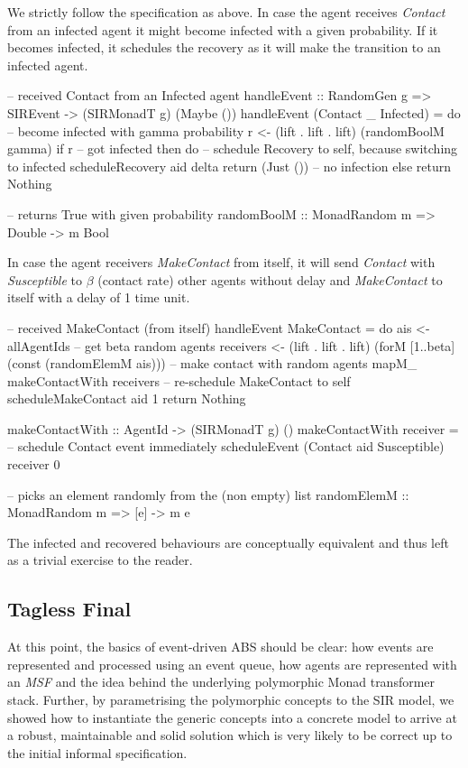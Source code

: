 We strictly follow the specification as above. In case the agent receives \textit{Contact} from an infected agent it might become infected with a given probability. If it becomes infected, it schedules the recovery as it will make the transition to an infected agent.

\begin{HaskellCode}
-- received Contact from an Infected agent
handleEvent :: RandomGen g => SIREvent -> (SIRMonadT g) (Maybe ())
handleEvent (Contact _ Infected) = do
  -- become infected with gamma probability
  r <- (lift . lift . lift) (randomBoolM gamma)
  if r
    -- got infected 
    then do
      -- schedule Recovery to self, because switching to infected
      scheduleRecovery aid delta
      return (Just ())
    -- no infection
    else return Nothing

-- returns True with given probability
randomBoolM :: MonadRandom m => Double -> m Bool
\end{HaskellCode}

In case the agent receivers \textit{MakeContact} from itself, it will send \textit{Contact} with \textit{Susceptible} to $\beta$ (contact rate) other agents without delay and \textit{MakeContact} to itself with a delay of 1 time unit.

\begin{HaskellCode}
-- received MakeContact (from itself)
handleEvent MakeContact = do
  ais <- allAgentIds
  -- get beta random agents
  receivers <- (lift . lift . lift) (forM [1..beta] (const (randomElemM ais)))
  -- make contact with random agents
  mapM_ makeContactWith receivers
  -- re-schedule MakeContact to self
  scheduleMakeContact aid 1
  return Nothing
  
makeContactWith :: AgentId -> (SIRMonadT g) ()
makeContactWith receiver = 
  -- schedule Contact event immediately
  scheduleEvent (Contact aid Susceptible) receiver 0

-- picks an element randomly from the (non empty) list
randomElemM :: MonadRandom m => [e] -> m e
\end{HaskellCode}

The infected and recovered behaviours are conceptually equivalent and thus left as a trivial exercise to the reader. 

\subsection{Tagless Final}
At this point, the basics of event-driven ABS should be clear: how events are represented and processed using an event queue, how agents are represented with an \textit{MSF} and the idea behind the underlying polymorphic Monad transformer stack. Further, by parametrising the polymorphic concepts to the SIR model, we showed how to instantiate the generic concepts into a concrete model to arrive at a robust, maintainable and solid solution which is very likely to be correct up to the initial informal specification.

